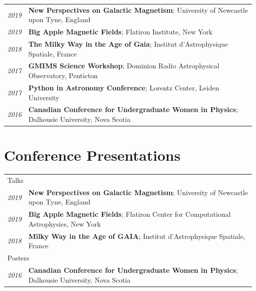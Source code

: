 \documentclass[10pt]{res} %
\begin{document}
\begin{resume}
\begin{table}[h!]
\begin{tabularx}{\textwidth}{lX}
 \textit{2019} & \textbf{New Perspectives on Galactic Magnetism}; University of Newcastle upon Tyne, England \\
 \textit{2019} & \textbf{Big Apple Magnetic Fields}; Flatiron Institute, New York \\
\textit{2018} & \textbf{The Milky Way in the Age of Gaia}; Institut d'Astrophysique Spatiale, France \\
\textit{2017} & \textbf{GMIMS Science Workshop}; Dominion Radio Astrophysical Observatory, Penticton \\
\textit{2017} & \textbf{Python in Astronomy Conference}; Lorentz Center, Leiden University \\
\textit{2016} & \textbf{Canadian Conference for Undergraduate Women in Physics}; Dalhousie University, Nova Scotia
\end{tabularx}
\end{table}


\section{\Large Conference Presentations}
\vspace{-5pt} %
\noindent\makebox[\linewidth]{\rule{\textwidth}{0.4pt}}
\vspace{-20pt} %

\begin{table}[h!]
\begin{tabularx}{\textwidth}{lX}
\multicolumn{2}{l}{ \rule{0pt}{3ex} \large \hspace{-12pt} Talks \dotfill \rule[-1.2ex]{0pt}{0pt}} \\
\textit{2019} & \textbf{New Perspectives on Galactic Magnetism}; University of Newcastle upon Tyne, England \\
\textit{2019} & \textbf{Big Apple Magnetic Fields}; Flatiron Center for Computational Astrophysics, New York \\
\textit{2018} & \textbf{Milky Way in the Age of GAIA}; Institut d'Astrophysique Spatiale, France \\
\multicolumn{2}{l}{ \rule{0pt}{3ex} \large \hspace{-12pt} Posters \dotfill \rule[-1.2ex]{0pt}{0pt}}  \\
\textit{2016} & \textbf{Canadian Conference for Undergraduate Women in Physics}; Dalhousie University, Nova Scotia
\end{tabularx}
\end{table}


\end{resume}
\end{document}
